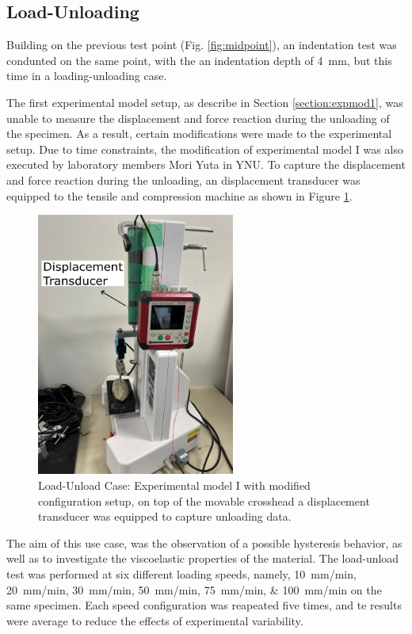 \subsection*{Load-Unloading}
\label{subsection:loadunload}
Building on the previous test point (Fig. \ref{fig:midpoint}), an indentation
 test was condunted on the same point, with the an indentation depth of 
 \SI{4}{\milli \m}, but this time in a loading-unloading case.

The first experimental model setup, as describe in Section \ref{section:expmod1},
was unable to measure the displacement and force reaction during the unloading 
of the specimen. As a result, certain modifications were made to the experimental 
setup. Due to time constraints, the modification of experimental model I 
was also executed by laboratory members Mori Yuta in YNU.
To capture the displacement and force reaction during the unloading, an 
displacement transducer was equipped to the tensile and compression machine 
as shown in Figure \ref{fig:unloadingexp1}.

\begin{figure}%
    \centering
   \quad
   \includegraphics[width=6.5cm]{Images/Experiment/unloading.png}%
   \caption{Load-Unload Case: Experimental model I with modified configuration setup, on top of the movable crosshead a displacement transducer was equipped to capture unloading data.}%
   \label{fig:unloadingexp1}%
\end{figure}
 
The aim of this use case, was the observation of a possible hysteresis
behavior, as well as to investigate the viscoelastic properties of the material.
The load-unload test was performed at six different loading speeds, namely, 
\SIlist[per-mode = symbol]{10;20;30;50;75;100}{\milli \metre \per \minute} on the 
same specimen.
Each speed configuration was reapeated five times, and te results were average to 
reduce the effects of experimental variability.\\

